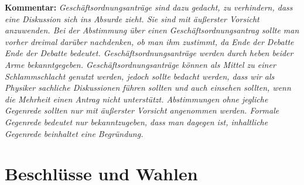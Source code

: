 \documentclass[draft,12pt,oneside]{scrreprt}
\begin{document}
\textbf{Kommentar:} \textit{\footnotesize Geschäftsordnungsanträge sind dazu
  gedacht, zu verhindern, dass eine Diskussion sich ins Absurde zieht.
  Sie sind mit äußerster Vorsicht anzuwenden.
  Bei der Abstimmung über einen Geschäftsordnungsantrag sollte man vorher dreimal
  darüber nachdenken, ob man ihm zustimmt, da Ende der Debatte Ende der Debatte
  bedeutet.
  Geschäftsordnungsanträge werden durch heben beider Arme bekanntgegeben.
  Geschäftsordnungsanträge können als Mittel zu einer Schlammschlacht genutzt
  werden, jedoch sollte bedacht werden, dass wir als Physiker sachliche
  Diskussionen führen sollten und auch einsehen sollten, wenn die Mehrheit einen
  Antrag nicht unterstützt.
  Abstimmungen ohne jegliche Gegenrede sollten nur mit äußerster Vorsicht
  angenommen werden.
  Formale Gegenrede bedeutet nur bekanntzugeben, dass man dagegen ist, inhaltliche
  Gegenrede beinhaltet eine Begründung.}

\section{Beschlüsse und Wahlen}
\end{document}
